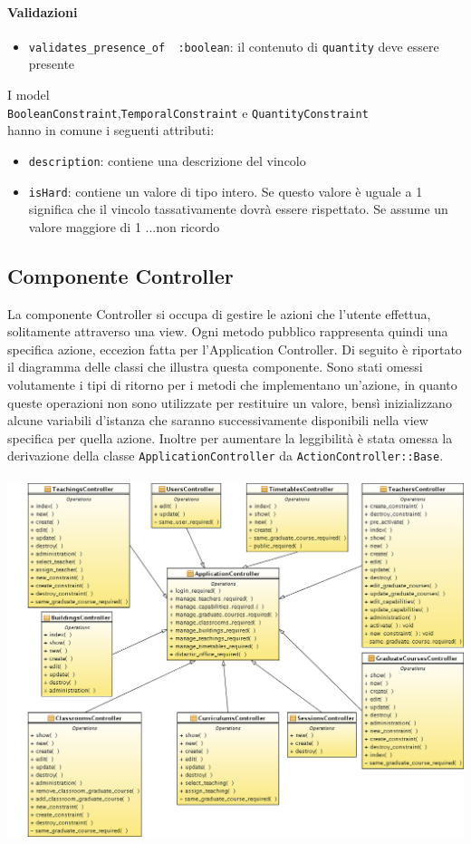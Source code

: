 \documentclass[11pt,a4paper]{article}
\begin{document}
\paragraph{Validazioni}
\begin{itemize}
 \item \verb|validates_presence_of  :boolean|: il contenuto di \verb|quantity| deve essere presente
\end{itemize}

I model \\
\verb|BooleanConstraint|,\verb|TemporalConstraint| e \verb|QuantityConstraint| \\
hanno in comune i seguenti attributi:
\begin{itemize}
 \item \verb|description|: contiene una descrizione del vincolo
 \item \verb|isHard|: contiene un valore di tipo intero. Se questo valore è uguale a 1 significa che il vincolo tassativamente dovrà essere rispettato. Se assume un valore maggiore di 1 ...non ricordo	
\end{itemize}
\subsection{Componente Controller}
La componente Controller si occupa di gestire le azioni che l'utente effettua, solitamente attraverso una view. Ogni metodo pubblico rappresenta quindi una specifica azione, eccezion fatta per l'Application Controller.
Di seguito è riportato il diagramma delle classi che illustra questa componente. Sono stati omessi volutamente i tipi di ritorno per i metodi che implementano un'azione, in quanto queste operazioni non sono utilizzate per restituire un valore, bensì inizializzano alcune variabili d'istanza che saranno successivamente disponibili nella view specifica per quella azione. Inoltre per aumentare la leggibilità è stata omessa la derivazione della classe \verb|ApplicationController| da \verb|ActionController::Base|. \\
\bigskip \\
\includegraphics[scale=0.34]{images/Controller_ClassDiagram.png}
\end{document}
